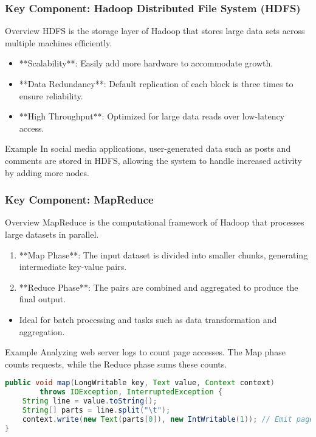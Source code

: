 \documentclass[aspectratio=169]{beamer}
\begin{document}
\begin{frame}[fragile]
    \frametitle{Key Component: Hadoop Distributed File System (HDFS)}
    \begin{block}{Overview}
        HDFS is the storage layer of Hadoop that stores large data sets across multiple machines efficiently.
    \end{block}
    \begin{itemize}
        \item **Scalability**: Easily add more hardware to accommodate growth.
        \item **Data Redundancy**: Default replication of each block is three times to ensure reliability.
        \item **High Throughput**: Optimized for large data reads over low-latency access.
    \end{itemize}
    \begin{block}{Example}
        In social media applications, user-generated data such as posts and comments are stored in HDFS, allowing the system to handle increased activity by adding more nodes.
    \end{block}
\end{frame}

\begin{frame}[fragile]
    \frametitle{Key Component: MapReduce}
    \begin{block}{Overview}
        MapReduce is the computational framework of Hadoop that processes large datasets in parallel.
    \end{block}
    \begin{enumerate}
        \item **Map Phase**: The input dataset is divided into smaller chunks, generating intermediate key-value pairs.
        \item **Reduce Phase**: The pairs are combined and aggregated to produce the final output.
    \end{enumerate}
    \begin{itemize}
        \item Ideal for batch processing and tasks such as data transformation and aggregation.
    \end{itemize}
    \begin{block}{Example}
        Analyzing web server logs to count page accesses. The Map phase counts requests, while the Reduce phase sums these counts.
    \end{block}
    \begin{lstlisting}[language=Java, caption=Sample Map Function]
public void map(LongWritable key, Text value, Context context)
        throws IOException, InterruptedException {
    String line = value.toString();
    String[] parts = line.split("\t");
    context.write(new Text(parts[0]), new IntWritable(1)); // Emit page and count (1)
}
    \end{lstlisting}
\end{frame}
\end{document}
